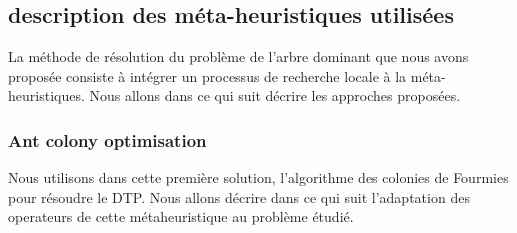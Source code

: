\subsection{description des méta-heuristiques utilisées}
La méthode de résolution du problème de l’arbre dominant que nous avons proposée consiste à intégrer un processus de recherche locale  à la méta-heuristiques. Nous allons dans ce qui suit décrire les approches proposées. 

\subsubsection{Ant colony optimisation}
Nous utilisons dans cette première solution, l'algorithme des colonies de Fourmies pour résoudre le DTP. Nous allons décrire dans ce qui suit l'adaptation des operateurs de  cette métaheuristique au problème étudié. 

